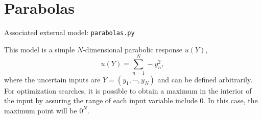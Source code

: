 \section{Parabolas}
Associated external model: \texttt{parabolas.py}

This model is a simple $N$-dimensional parabolic response $u(Y)$,
\begin{equation}
  u(Y) = \sum_{n=1}^N -y_n^2,
\end{equation}
where the uncertain inputs are $Y=(y_1,\cdots,y_N)$ and can be defined arbitrarily.  For optimization
searches, it is possible to obtain a maximum in the interior of the input by assuring the range of each
input variable include 0.  In this case, the maximum point will be ${0}^N$.
